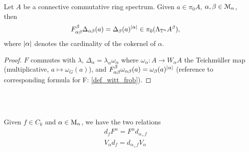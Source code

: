   \begin{lem}\label{lem_rel_F_Delta}
    Let $A$ be a connective commutative ring spectrum. Given $a \in \pi_0 A$, $\alpha, \beta \in \mathcal{M}_n$, then 
    \begin{displaymath}
      F_{\alpha\beta}^{\beta} \Delta_{\alpha\beta}(a) = %
        \Delta_{\beta} (a)^{\abs{\alpha}} \in \pi_0(\Lambda_{\sT^n} A ^\beta),
    \end{displaymath}
    where $\left\vert\alpha\right\vert$ denotes the cardinality of the cokernel of $\alpha$.
    \begin{proof}
      $F$ commutes with $\lambda$, $\Delta_\alpha = \lambda_\alpha
      \omega_\alpha$ where $\omega_\alpha: A \to W_\alpha A$ the Teichm\"uller map
      (multiplicative, $a \mapsto \omega_G(a)$), and $F_{\alpha\beta}^\beta
      \omega_{\alpha\beta}(a) = \omega_\beta(a)^{\left\vert\alpha\right\vert}$ (reference to
      corresponding formula for F: \ref{def_witt_frob}). 
    \end{proof}
  \end{lem}
  \\
  \\
  \begin{lem}\label{lem_rel_V_d_F_d}
    Given $f \in C_k$ and $\alpha \in \mathrm{M}_n$, we have the two relations
      \begin{gather*}
        d_f F^\alpha = F^\alpha d_{\alpha_+ f} \\
        V_\alpha d_f = d_{\alpha_+ f} V_\alpha 
      \end{gather*}
  \end{lem}
